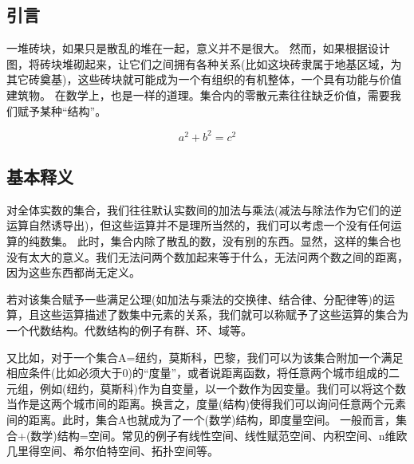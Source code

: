 

\subsection{引言}
一堆砖块，如果只是散乱的堆在一起，意义并不是很大。
然而，如果根据设计图，将砖块堆砌起来，让它们之间拥有各种关系(比如这块砖隶属于地基区域，为其它砖奠基)，这些砖块就可能成为一个有组织的有机整体，一个具有功能与价值建筑物。
在数学上，也是一样的道理。集合内的零散元素往往缺乏价值，需要我们赋予某种“结构”。

\begin{equation}
a^2 + b^2 = c^2 %
\end{equation}

\subsection{基本释义}
对全体实数的集合，我们往往默认实数间的加法与乘法(减法与除法作为它们的逆运算自然诱导出)，但这些运算并不是理所当然的，我们可以考虑一个没有任何运算的纯数集。
此时，集合内除了散乱的数，没有别的东西。显然，这样的集合也没有太大的意义。我们无法问两个数加起来等于什么，无法问两个数之间的距离，因为这些东西都尚无定义。 

若对该集合赋予一些满足公理(如加法与乘法的交换律、结合律、分配律等)的运算，且这些运算描述了数集中元素的关系，我们就可以称赋予了这些运算的集合为一个代数结构。代数结构的例子有群、环、域等。

又比如，对于一个集合A={纽约，莫斯科，巴黎}，我们可以为该集合附加一个满足相应条件(比如必须大于0)的“度量”，或者说距离函数，将任意两个城市组成的二元组，例如(纽约，莫斯科)作为自变量，以一个数作为因变量。我们可以将这个数当作是这两个城市间的距离。换言之，度量(结构)使得我们可以询问任意两个元素间的距离。此时，集合A也就成为了一个(数学)结构，即度量空间。
一般而言，集合+(数学)结构=空间。常见的例子有线性空间、线性赋范空间、内积空间、n维欧几里得空间、希尔伯特空间、拓扑空间等。


